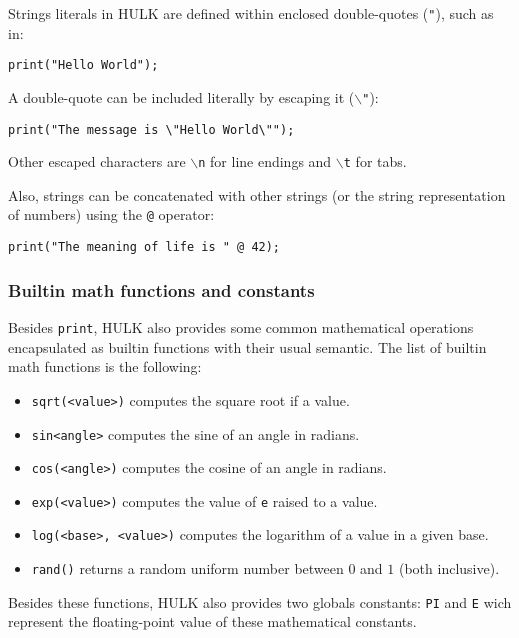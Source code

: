 \documentclass[a4paper, 12pt]{report}
\begin{document}
Strings literals in HULK are defined within enclosed double-quotes ({\tt "}), such as in:

\begin{lstlisting}
print("Hello World");
\end{lstlisting}

A double-quote can be included literally by escaping it ($\backslash${\tt "}):

\begin{lstlisting}
print("The message is \"Hello World\"");
\end{lstlisting}

Other escaped characters are $\backslash${\tt n} for line endings and $\backslash${\tt t} for tabs. 

Also, strings can be concatenated with other strings (or the string representation of numbers) using the {\tt @}
operator:

\begin{lstlisting}
print("The meaning of life is " @ 42);
\end{lstlisting}

\subsubsection*{Builtin math functions and constants}

Besides {\tt print}, HULK also provides some common mathematical operations encapsulated as
builtin functions with their usual semantic. The list of builtin math functions is the following:

\begin{itemize}
  \item {\tt sqrt(<value>)} computes the square root if a value.
  \item {\tt sin{<angle>}} computes the sine of an angle in radians.
  \item {\tt cos(<angle>)} computes the cosine of an angle in radians.
  \item {\tt exp(<value>)} computes the value of {\tt e} raised to a value.
  \item {\tt log(<base>, <value>)} computes the logarithm of a value in a given base.
  \item {\tt rand()} returns a random uniform number between $0$ and $1$ (both inclusive).
\end{itemize}

Besides these functions, HULK also provides two globals constants: {\tt PI} and {\tt E} wich represent
the floating-point value of these mathematical constants.
\end{document}
